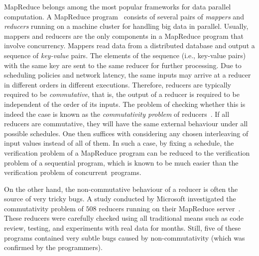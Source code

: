 \documentclass{llncs}
\begin{document}
MapReduce belongs among the most popular frameworks for data parallel
computation. A MapReduce program~\cite{dean04} consists of several pairs
of \emph{mappers} and \emph{reducers} running on a machine cluster for handling
big data in parallel. Usually, mappers and reducers are the only components in a
MapReduce program that involve concurrency. Mappers read data from a distributed
database and output a sequence of \emph{key-value} pairs. The elements of the
sequence (i.e., key-value pairs) with the same key are sent to the same reducer
for further processing. Due to scheduling policies and network latency, the same
inputs may arrive at a reducer in different orders in different executions.
Therefore, reducers are typically required to be \emph{commutative}, that is,
the output of a reducer is required to be independent of the order of its
inputs. The problem of checking whether this is indeed the case is known as the
\emph{commutativity problem} of
reducers~\cite{csallner13testing,xiao14mr,ChenHSW15,ChenSW16}. If all reducers
are commutative, they will have the same external behaviour under all possible
schedules. 
One then suffices with considering any chosen interleaving
of input values instead of all of them.
In such a case, by fixing a schedule, the verification problem of a
MapReduce program can be reduced to the verification problem of a sequential
program, which is known to be much easier than the verification problem of
concurrent~programs.


On the other hand, the non-commutative behaviour of a reducer is often the source
of very tricky bugs. A study conducted by Microsoft investigated the
commutativity problem of $508$ reducers running on their MapReduce
server~\cite{xiao14mr}. These reducers were carefully checked using all
traditional means such as code review, testing, and experiments with real data
for months. Still, five of these programs contained very subtle bugs caused by
non-commutativity (which was confirmed by the programmers).
\end{document}
